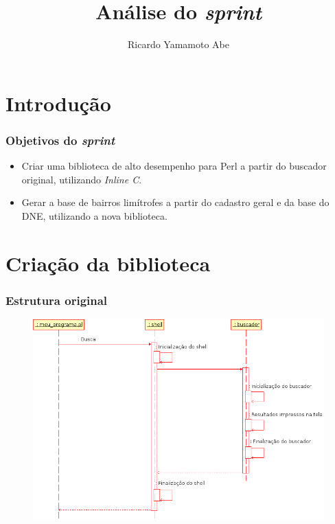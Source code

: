 \documentclass{beamer}
\title{An\'alise do \textit{sprint}}
\author{Ricardo Yamamoto Abe}
\date{}
\begin{document}
\beamertemplatetransparentcoveredmedium

\frame{\titlepage}


\section{Introdu\c{c}\~ao}

\frame 
{
  \frametitle{Objetivos do \textit{sprint}}

  \begin{itemize}[<+->]
  \item Criar uma biblioteca de alto desempenho para Perl a partir do buscador
    original, utilizando \textit{Inline C}.
    
  \item Gerar a base de bairros lim\'itrofes a partir do cadastro
  geral e da base do DNE, utilizando a nova biblioteca.
  \end{itemize}
}

\section{Cria\c{c}\~ao da biblioteca}

\frame
{
  \frametitle{Estrutura original}

  \begin{figure}[h]
    \centering
    \includegraphics [scale=0.35,]{antigo.png}
  \end{figure}
}
\end{document}
